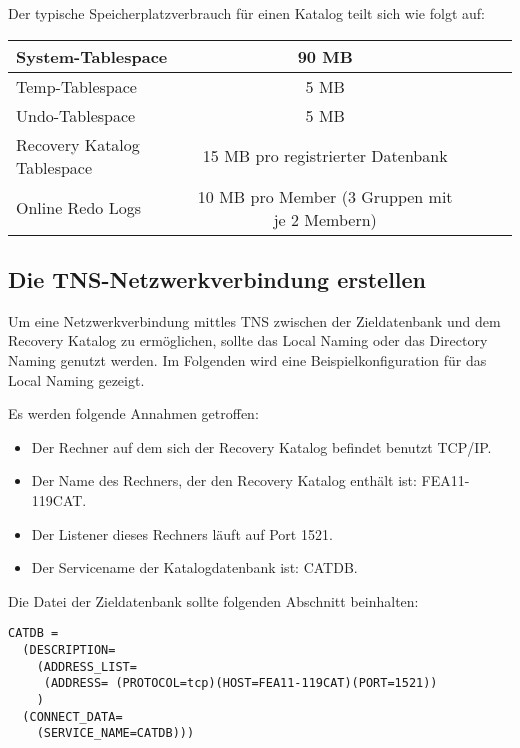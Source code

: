         Der typische Speicherplatzverbrauch für einen Katalog teilt sich wie folgt auf:
        \begin{center}
          \tabletail{%
            \hline
          }
          \begin{supertabular}[h]{|l|c|c|c|p{7cm}|}
          System-Tablespace & 90 MB \\
          \hline
          Temp-Tablespace & 5 MB \\
          \hline
          Undo-Tablespace & 5 MB \\
          \hline
          Recovery Katalog Tablespace & 15 MB pro registrierter Datenbank \\
          \hline
          Online Redo Logs & 10 MB pro Member (3 Gruppen mit je 2 Membern) \\
          \end{supertabular}
        \end{center}
\clearpage
      \subsection{Die TNS-Netzwerkverbindung erstellen}
        Um eine Netzwerkverbindung mittles TNS zwischen der Zieldatenbank und dem Recovery Katalog zu ermöglichen, sollte das Local Naming oder das Directory Naming genutzt werden. Im Folgenden wird eine Beispielkonfiguration für das Local Naming gezeigt.

        Es werden folgende Annahmen getroffen:
        \begin{itemize}
          \item Der Rechner auf dem sich der Recovery Katalog befindet benutzt TCP/IP.
          \item Der Name des Rechners, der den Recovery Katalog enthält ist: FEA11-119CAT.
          \item Der Listener dieses Rechners läuft auf Port 1521.
          \item Der Servicename der Katalogdatenbank ist: CATDB.
        \end{itemize}
        Die Datei  der Zieldatenbank sollte folgenden Abschnitt beinhalten:
        \begin{lstlisting}[caption={Der Net Service Name der CATDB},label=admin1200,language=configfile]
CATDB =
  (DESCRIPTION=
    (ADDRESS_LIST=
     (ADDRESS= (PROTOCOL=tcp)(HOST=FEA11-119CAT)(PORT=1521))
    )
  (CONNECT_DATA=
    (SERVICE_NAME=CATDB)))
        \end{lstlisting}
